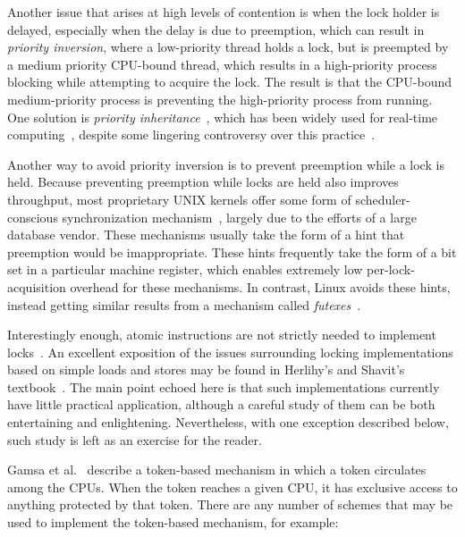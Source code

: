 Another issue that arises at high levels of contention is when the
lock holder is delayed, especially when the delay is due to
preemption, which can result in \emph{priority inversion},
where a low-priority thread holds a lock, but is preempted
by a medium priority CPU-bound thread, which results in
a high-priority process blocking while attempting to acquire the
lock.
The result is that the CPU-bound medium-priority process is preventing the
high-priority process from running.
One solution is \emph{priority inheritance}~\cite{Lampson1980Mesa},
which has been widely used for real-time
computing~\cite{Sha1990IEEETransComp,JonathanCorbet2006PriorityInheritance},
despite some lingering controversy over this
practice~\cite{Yodaiken2004FSM,DougLocke2002a}.

Another way to avoid priority inversion is to prevent preemption
while a lock is held.
Because preventing preemption while locks are held also improves throughput,
most proprietary UNIX kernels offer some form of scheduler-conscious
synchronization mechanism~\cite{Kontothanassis97a},
largely due to the efforts of a large database vendor.
These mechanisms usually take the form of a hint that preemption
would be imappropriate.
These hints frequently take the form of a bit set in a particular
machine register, which enables extremely low per-lock-acquisition overhead
for these mechanisms.
In contrast, Linux avoids these hints, instead getting
similar results from a mechanism called
\emph{futexes}~\cite{HubertusFrancke2002Futex,IngoMolnar2006RobustFutexes,StevenRostedt2006piFutexes}.

Interestingly enough, atomic instructions are not strictly needed to
implement locks~\cite{Dijkstra65a,Lamport74a}.
An excellent exposition of the issues surrounding locking implementations
based on simple loads and stores may be found in Herlihy's and
Shavit's textbook~\cite{HerlihyShavit2008Textbook}.
The main point echoed here is that such implementations currently
have little practical application, although a careful study of
them can be both entertaining and enlightening.
Nevertheless, with one exception described below, such study is left
as an exercise for the reader.

Gamsa et al.~\cite[Section 5.3]{Gamsa99} describe a token-based
mechanism in which a token circulates among the CPUs.
When the token reaches a given CPU, it has exclusive
access to anything protected by that token.
There are any number of schemes that may be used to implement
the token-based mechanism, for example:

